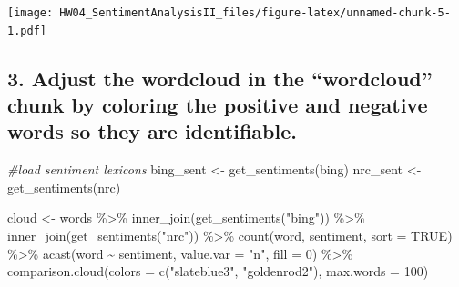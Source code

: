 \documentclass[
]{article}
\newenvironment{Shaded}{\begin{snugshade}}{\end{snugshade}}
\newcommand{\AttributeTok}[1]{\textcolor[rgb]{0.77,0.63,0.00}{#1}}
\newcommand{\CommentTok}[1]{\textcolor[rgb]{0.56,0.35,0.01}{\textit{#1}}}
\newcommand{\ConstantTok}[1]{\textcolor[rgb]{0.00,0.00,0.00}{#1}}
\newcommand{\DecValTok}[1]{\textcolor[rgb]{0.00,0.00,0.81}{#1}}
\newcommand{\FunctionTok}[1]{\textcolor[rgb]{0.00,0.00,0.00}{#1}}
\newcommand{\NormalTok}[1]{#1}
\newcommand{\OtherTok}[1]{\textcolor[rgb]{0.56,0.35,0.01}{#1}}
\newcommand{\SpecialCharTok}[1]{\textcolor[rgb]{0.00,0.00,0.00}{#1}}
\newcommand{\StringTok}[1]{\textcolor[rgb]{0.31,0.60,0.02}{#1}}
\begin{document}
\texttt{[image: HW04\_SentimentAnalysisII\_files/figure-latex/unnamed-chunk-5-1.pdf]}

\hypertarget{adjust-the-wordcloud-in-the-wordcloud-chunk-by-coloring-the-positive-and-negative-words-so-they-are-identifiable.}{%
\subsection{3. Adjust the wordcloud in the ``wordcloud'' chunk by
coloring the positive and negative words so they are
identifiable.}\label{adjust-the-wordcloud-in-the-wordcloud-chunk-by-coloring-the-positive-and-negative-words-so-they-are-identifiable.}}

\begin{Shaded}
\begin{Highlighting}[]
\CommentTok{\#load sentiment lexicons}
\NormalTok{bing\_sent }\OtherTok{\textless{}{-}} \FunctionTok{get\_sentiments}\NormalTok{(}\StringTok{\textquotesingle{}bing\textquotesingle{}}\NormalTok{)}
\NormalTok{nrc\_sent }\OtherTok{\textless{}{-}} \FunctionTok{get\_sentiments}\NormalTok{(}\StringTok{\textquotesingle{}nrc\textquotesingle{}}\NormalTok{)}
\end{Highlighting}
\end{Shaded}

\begin{Shaded}
\begin{Highlighting}[]
\NormalTok{cloud }\OtherTok{\textless{}{-}}\NormalTok{ words }\SpecialCharTok{\%\textgreater{}\%} \FunctionTok{inner\_join}\NormalTok{(}\FunctionTok{get\_sentiments}\NormalTok{(}\StringTok{"bing"}\NormalTok{)) }\SpecialCharTok{\%\textgreater{}\%}
  \FunctionTok{inner\_join}\NormalTok{(}\FunctionTok{get\_sentiments}\NormalTok{(}\StringTok{"nrc"}\NormalTok{)) }\SpecialCharTok{\%\textgreater{}\%}
  \FunctionTok{count}\NormalTok{(word, sentiment, }\AttributeTok{sort =} \ConstantTok{TRUE}\NormalTok{) }\SpecialCharTok{\%\textgreater{}\%}
  \FunctionTok{acast}\NormalTok{(word }\SpecialCharTok{\textasciitilde{}}\NormalTok{ sentiment, }\AttributeTok{value.var =} \StringTok{"n"}\NormalTok{, }\AttributeTok{fill =} \DecValTok{0}\NormalTok{) }\SpecialCharTok{\%\textgreater{}\%}
  \FunctionTok{comparison.cloud}\NormalTok{(}\AttributeTok{colors =} \FunctionTok{c}\NormalTok{(}\StringTok{"slateblue3"}\NormalTok{, }\StringTok{"goldenrod2"}\NormalTok{),}
                   \AttributeTok{max.words =} \DecValTok{100}\NormalTok{)}
\end{Highlighting}
\end{Shaded}
\end{document}
